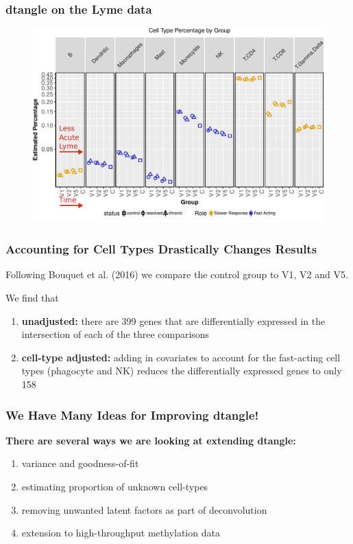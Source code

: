 \documentclass[usenames,dvipsnames,15pt]{beamer}
\newcommand{\cbo}{\color{BurntOrange}}
\begin{document}
\begin{frame}
  \frametitle{dtangle on the Lyme data}
  \vspace*{-.9cm}\begin{figure}
    \hspace*{-.9cm}\includegraphics[scale=.37]{pictures/ctypes2.pdf}
  \end{figure}
\end{frame}

\begin{frame}
  \frametitle{Accounting for Cell Types Drastically Changes Results}
  Following Bouquet et al. (2016) we compare the control group to V1, V2 and V5.

  We find that
  \begin{enumerate}
    \item {\bf unadjusted:} there are {\cbo 399} genes that are differentially expressed in the intersection of each of the three comparisons
    \item {\bf cell-type adjusted:} adding in covariates to account for the fast-acting cell types (phagocyte and NK) reduces the differentially expressed genes to only {\cbo 158}
  \end{enumerate}
\end{frame}

\begin{frame}
  \frametitle{We Have Many Ideas for Improving dtangle!}
  {\bf There are several ways we are looking at extending dtangle:}
  \begin{enumerate}
  \item variance and goodness-of-fit 
  \item estimating proportion of unknown cell-types
  \item removing unwanted latent factors as part of deconvolution
  \item extension to high-throughput methylation data
  \end{enumerate}
\end{frame}
\end{document}
